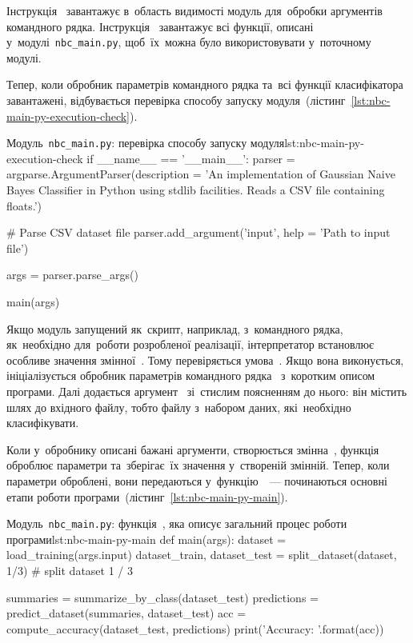 \documentclass[
	a4paper,
	oneside,
	DIV = 12,
	fontsize = 13pt,
	headings = normal,
	numbers = endperiod,
]{scrartcl}
\theoremstyle{mythm}
\newcommand{\filename}[1]{\texttt{#1}}
\begin{document}
			Інструкція~ завантажує в~область видимості модуль для~обробки аргументів командного рядка. Інструкція~ завантажує всі функції, описані у~модулі~\filename{nbc\_main.py}, щоб~їх~можна було використовувати у~поточному модулі. 

			Тепер, коли обробник параметрів командного рядка та~всі функції класифікатора завантажені, відбувається перевірка способу запуску модуля~(лістинг~\ref{lst:nbc-main-py-execution-check}). 

			\begin{listingpython}{Модуль~\filename{nbc\_main.py}: перевірка способу запуску модуля}{lst:nbc-main-py-execution-check}
if __name__ == '__main__':
parser = argparse.ArgumentParser(description = 'An implementation of Gaussian Naive Bayes Classifier in Python using stdlib facilities. Reads a CSV file containing floats.')

# Parse CSV dataset file
parser.add_argument('input', help = 'Path to input file')

args = parser.parse_args()

main(args)
			\end{listingpython}

			Якщо модуль запущений як~скрипт, наприклад, з~командного рядка, як~необхідно для~роботи розробленої реалізації, інтерпретатор встановлює особливе значення змінної~. Тому перевіряється умова~. Якщо вона виконується, ініціалізується обробник параметрів командного рядка~ з~коротким описом програми. Далі додається аргумент~ зі~стислим поясненням до нього: він містить шлях до вхідного файлу, тобто файлу з~набором даних, які~необхідно класифікувати.

			Коли у~обробнику описані бажані аргументи, створюється змінна~, функція~ оброблює параметри та~зберігає~їх значення у~створеній змінній. Тепер, коли параметри оброблені, вони передаються у~функцію~~— починаються основні етапи роботи програми~(лістинг~\ref{lst:nbc-main-py-main}).

			\begin{listingpython}{Модуль~\filename{nbc\_main.py}: функція~, яка описує загальний процес роботи програми}{lst:nbc-main-py-main}
def main(args):
	dataset = load_training(args.input)
	dataset_train, dataset_test = split_dataset(dataset, 1/3) # split dataset 1 / 3

	summaries = summarize_by_class(dataset_test)
	predictions = predict_dataset(summaries, dataset_test)
	acc = compute_accuracy(dataset_test, predictions)
	print('Accuracy: {}'.format(acc))
				\end{listingpython}
			
\end{document}
